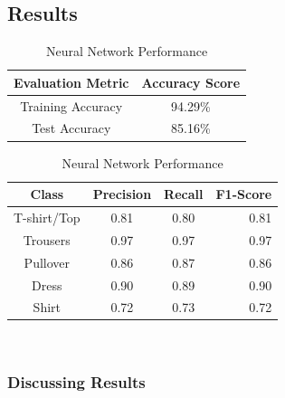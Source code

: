 \subsection{Results}

\begin{table}[!ht]
\begin{subtable}[c]{0.4\textwidth}
\footnotesize
\centering
\begin{tabular}{ c | c }
 \toprule
 Evaluation Metric & Accuracy Score  \\
 \midrule
 Training Accuracy & 94.29\% \\
 Test Accuracy & 85.16\% \\
 \bottomrule
\end{tabular}
\captionsetup{justification=centering,margin=1cm}
\end{subtable}
\begin{subtable}[c]{0.6\textwidth}
\footnotesize
\centering
\begin{tabular}{c | c c r}
Class & Precision & Recall & F1-Score\\
\midrule
T-shirt/Top   &    0.81  &    0.80  &    0.81 \\
Trousers   &    0.97  &    0.97  &    0.97 \\
Pullover   &    0.86  &    0.87  &    0.86\\
Dress   &    0.90  &    0.89  &    0.90\\
Shirt   &    0.72  &    0.73  &    0.72\\
\end{tabular}
\captionsetup{justification=centering,margin=1cm}
\end{subtable}
\caption{Neural Network Performance}
\label{nn_evaluation}
\end{table}\\

\subsubsection{Discussing Results}







